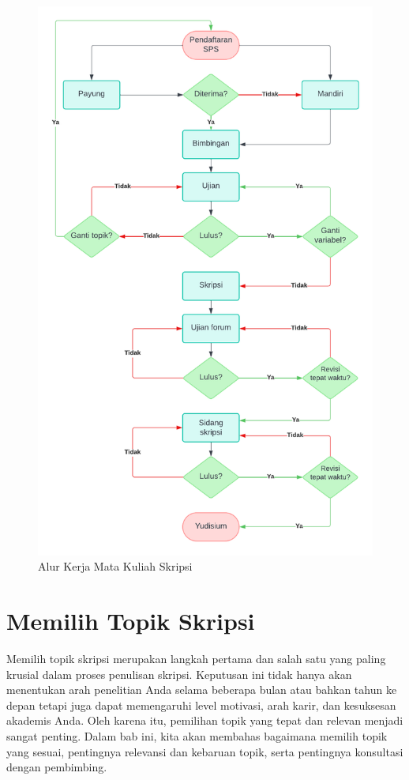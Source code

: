 \documentclass[
  indonesian,
  letterpaper,
]{scrbook}
\begin{document}
\begin{figure}[H]

{\centering \includegraphics[width=4.6875in,height=\textheight,keepaspectratio]{images/1_1_alurskripsi.png}

}

\caption{Alur Kerja Mata Kuliah Skripsi}

\end{figure}%


\chapter{Memilih Topik Skripsi}\label{memilih-topik-skripsi}

Memilih topik skripsi merupakan langkah pertama dan salah satu yang
paling krusial dalam proses penulisan skripsi. Keputusan ini tidak hanya
akan menentukan arah penelitian Anda selama beberapa bulan atau bahkan
tahun ke depan tetapi juga dapat memengaruhi level motivasi, arah karir,
dan kesuksesan akademis Anda. Oleh karena itu, pemilihan topik yang
tepat dan relevan menjadi sangat penting. Dalam bab ini, kita akan
membahas bagaimana memilih topik yang sesuai, pentingnya relevansi dan
kebaruan topik, serta pentingnya konsultasi dengan pembimbing.
\end{document}
